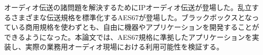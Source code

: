 \begin{jabstract}
  オーディオ伝送の諸問題を解決するためにIPオーディオ伝送が登場した。乱立するさまざまな伝送規格を標準化するAES67が登場した。ブラックボックスとなっている商用規格を使わずとも、自由に機器やアプリケーションを開発することができるようになった。本論文では、AES67規格に準拠したアプリケーションを実装し、実際の業務用オーディオ現場における利用可能性を検証する。
\end{jabstract}
